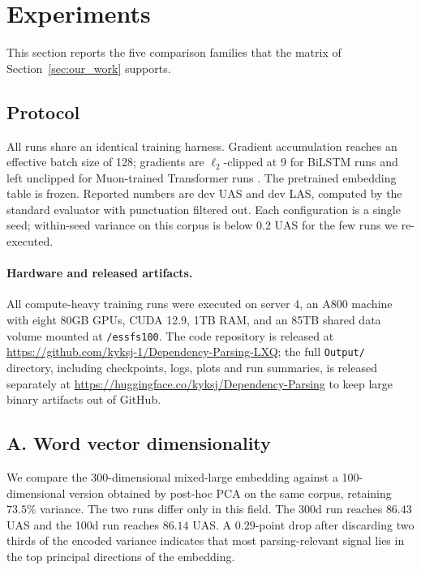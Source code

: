 \section{Experiments}
\label{sec:experiment}

This section reports the five comparison families that the matrix of Section~\ref{sec:our_work} supports.

\subsection{Protocol}
\label{sec:exp-protocol}

All runs share an identical training harness. Gradient accumulation reaches an effective batch size of 128; gradients are $\ell_2$-clipped at 9 for BiLSTM runs and left unclipped for Muon-trained Transformer runs \citep{jordan2024muon}. The pretrained embedding table is frozen. Reported numbers are dev UAS and dev LAS, computed by the standard evaluator with punctuation filtered out. Each configuration is a single seed; within-seed variance on this corpus is below $0.2$ UAS for the few runs we re-executed.

\paragraph{Hardware and released artifacts.} All compute-heavy training runs were executed on server 4, an A800 machine with eight 80GB GPUs, CUDA 12.9, 1TB RAM, and an 85TB shared data volume mounted at \texttt{/essfs100}. The code repository is released at \url{https://github.com/kyksj-1/Dependency-Parsing-LXQ}; the full \texttt{Output/} directory, including checkpoints, logs, plots and run summaries, is released separately at \url{https://huggingface.co/kyksj/Dependency-Parsing} to keep large binary artifacts out of GitHub.

\subsection{A. Word vector dimensionality}
\label{sec:exp-dim}

We compare the 300-dimensional mixed-large embedding against a 100-dimensional version obtained by post-hoc PCA on the same corpus, retaining $73.5\%$ variance. The two runs differ only in this field. The 300d run reaches $86.43$ UAS and the 100d run reaches $86.14$ UAS. A $0.29$-point drop after discarding two thirds of the encoded variance indicates that most parsing-relevant signal lies in the top principal directions of the embedding.

